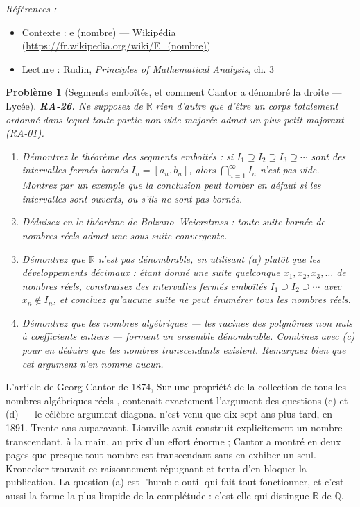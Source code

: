 \documentclass[11pt]{article}
\newtheorem{problem}{Problème}
\newenvironment{refs}{\par\small\noindent\emph{Références :}\begin{itemize}\setlength\itemsep{0pt}}{\end{itemize}\normalsize}
\begin{document}
\begin{refs}
\item Contexte : e (nombre) --- Wikipédia (\url{https://fr.wikipedia.org/wiki/E_(nombre)})
\item Lecture : Rudin, \textit{Principles of Mathematical Analysis}, ch. 3
\end{refs}

\bigskip

\begin{problem}[{Segments emboîtés, et comment Cantor a dénombré la droite --- Lycée}]
\textbf{RA-26.} Ne supposez de $ \mathbb{R} $ rien d'autre que d'être un corps totalement
ordonné dans lequel toute partie non vide majorée admet un plus petit majorant (RA-01).
\begin{enumerate}
\item[(a)] Démontrez le théorème des segments emboîtés : si $ I_1 \supseteq I_2 \supseteq I_3 \supseteq \cdots $
sont des intervalles fermés bornés $ I_n = [a_n, b_n] $, alors $ \bigcap_{n=1}^{\infty} I_n $ n'est
pas vide. Montrez par un exemple que la conclusion peut tomber en défaut si les intervalles sont
ouverts, ou s'ils ne sont pas bornés.
\item[(b)] Déduisez-en le théorème de Bolzano--Weierstrass : toute suite bornée de nombres réels admet une
sous-suite convergente.
\item[(c)] Démontrez que $ \mathbb{R} $ n'est pas dénombrable, en utilisant (a) plutôt que les
développements décimaux : étant donné une suite quelconque $ x_1, x_2, x_3, \dots $ de nombres
réels, construisez des intervalles fermés emboîtés $ I_1 \supseteq I_2 \supseteq \cdots $ avec
$ x_n \notin I_n $, et concluez qu'aucune suite ne peut énumérer tous les nombres réels.
\item[(d)] Démontrez que les nombres algébriques --- les racines des polynômes non nuls à coefficients
entiers --- forment un ensemble dénombrable. Combinez avec (c) pour en déduire que les nombres
transcendants existent. Remarquez bien que cet argument n'en nomme aucun.
\end{enumerate}

\end{problem}

\noindent L'article de Georg Cantor de 1874, \og{} Sur une propriété de la collection de tous
les nombres algébriques réels \fg{}, contenait exactement l'argument des questions (c) et (d) --- le
célèbre argument diagonal n'est venu que dix-sept ans plus tard, en 1891. Trente ans auparavant,
Liouville avait construit explicitement un nombre transcendant, à la main, au prix d'un effort
énorme ; Cantor a montré en deux pages que presque tout nombre est transcendant sans en exhiber un
seul. Kronecker trouvait ce raisonnement répugnant et tenta d'en bloquer la publication. La question
(a) est l'humble outil qui fait tout fonctionner, et c'est aussi la forme la plus limpide de la
complétude : c'est elle qui distingue $ \mathbb{R} $ de $ \mathbb{Q} $.
\end{document}
